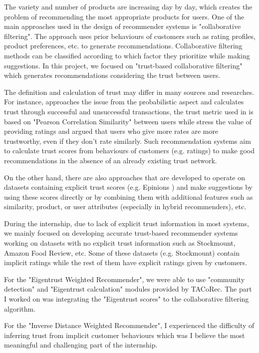 The variety and number of products are increasing day by day, which creates the problem of recommending the most appropriate products for users. One of the main approaches used in the design of recommender systems is "collaborative filtering". The approach uses prior behaviours of customers such as rating profiles, product preferences, etc. to generate recommendations. Collaborative filtering methods can be classified according to which factor they prioritize while making suggestions. In this project, we focused on "trust-based collaborative filtering" which generates recommendations considering the trust between users. 

The definition and calculation of trust may differ in many sources and researches. For instance, \cite{Eigentrust} approaches the issue from the probabilistic aspect and calculates trust through successful and unsuccessful transactions, the trust metric used in \cite{papagelis_article} is based on "Pearson Correlation Similarity" between users while \cite{lathia_article} stress the value of providing ratings and argued that users who give more rates are more trustworthy, even if they don't rate similarly. Such recommendation systems aim to calculate trust scores from behaviours of customers (e.g. ratings) to make good recommendations in the absence of an already existing trust network.

On the other hand, there are also approaches\cite{massa_article} that are developed to operate on datasets containing explicit trust scores (e.g. Epinions \cite{Epinions}) and make suggestions by using these scores directly or by combining them with additional features such as similarity, product, or user attributes (especially in hybrid recommenders), etc. 

During the internship, due to lack of explicit trust information in most systems, we mainly focused on developing accurate trust-based recommender systems working on datasets with no explicit trust information such as Stockmount, Amazon Food Review, etc. Some of these datasets (e.g. Stockmount) contain implicit ratings while the rest of them have explicit ratings given by customers.

For the "Eigentrust Weighted Recommender", we were able to use "community detection" and "Eigentrust calculation" modules provided by TACoRec. The part I worked on was integrating the "Eigentrust scores" to the collaborative filtering algorithm. 

For the "Inverse Distance Weighted Recommender", I experienced the difficulty of inferring trust from implicit customer behaviours which was I believe the most meaningful and challenging part of the internship.

